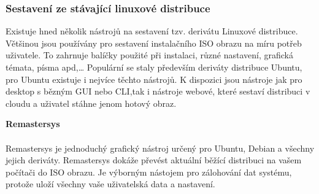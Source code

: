 \documentclass[a4paper,12pt]{article}
\newcommand{\nadpis}[1]{%
	\vspace{4 mm}
	\textbf{#1}\\
	\vspace{4 mm}
	}
\begin{document}
\subsubsection{Sestavení ze stávající linuxové distribuce} \label{sec:tvorbaDistribuce}
Existuje hned několik nástrojů na sestavení tzv. derivátu Linuxové distribuce. Většinou jsou používány pro sestavení instalačního ISO obrazu na míru potřeb uživatele. To zahrnuje balíčky použité při instalaci, různé nastavení, grafická témata, písma apd,… Populární se staly především deriváty distribuce Ubuntu, pro Ubuntu existuje i nejvíce těchto nástrojů. K dispozici jsou nástroje jak pro desktop s bězným GUI nebo CLI,tak i nástroje webové, které sestaví distribuci v cloudu a uživatel stáhne jenom hotový obraz.

\nadpis{Remastersys}\\
Remastersys je jednoduchý grafický nástroj určený pro Ubuntu, Debian a všechny jejich deriváty. Remastersys dokáže převést aktuální běžící distribuci na vašem počítači do ISO obrazu. Je výborným nástojem pro zálohování dat systému, protože uloží všechny vaše uživatelská data a nastavení.\cite{Linux_Build}
\end{document}
